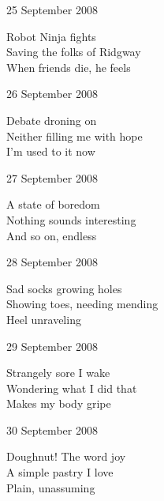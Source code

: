 \documentclass[12pt]{article}
\begin{document}
25 September 2008

Robot Ninja fights \\
Saving the folks of Ridgway \\
When friends die, he feels

\newpage

26 September 2008

Debate droning on \\
Neither filling me with hope \\
I'm used to it now

27 September 2008

A state of boredom \\
Nothing sounds interesting \\
And so on, endless

28 September 2008

Sad socks growing holes \\
Showing toes, needing mending \\
Heel unraveling

29 September 2008

Strangely sore I wake \\
Wondering what I did that \\
Makes my body gripe

30 September 2008

Doughnut! The word joy \\
A simple pastry I love \\
Plain, unassuming

\newpage
\end{document}
